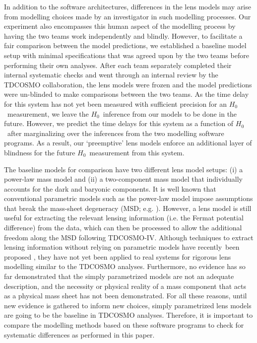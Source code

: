\documentclass[longauth]{aa}
\newcommand{\ho}{$H_0$}
\newcommand{\ajs}[1]{{{#1}}}
\begin{document}
In addition to the software architectures, differences in the lens models may arise from 
modelling choices made by an investigator in such modelling processes. Our experiment also encompasses this human aspect of the modelling process by having the two teams work independently and blindly. However, to facilitate a fair comparison between the model predictions, we established a baseline model setup with minimal specifications that was agreed upon by the two teams before performing their own analyses. After each team separately completed their internal systematic checks and \ajs{went} through an internal review by the TDCOSMO collaboration, the lens models were frozen and the model predictions were un-blinded to make comparisons between the two teams. As the time delay for this system has not yet been measured with sufficient precision for an \ho\ measurement, we leave the \ho\ inference from our models to be done in the future. However, we predict the time delays for this system as a function of \ho\ after marginalizing over the inferences from the two modelling \ajs{software programs}. As a result, our `preemptive' lens models enforce an additional layer of blindness for the future \ho\ measurement from this system. 

The baseline models for comparison have two different lens model setups: (i) a power-law mass model and (ii) a two-component mass model that individually accounts for the dark and baryonic components. 
It is well known that conventional parametric models such as the power-law model impose assumptions that break the mass-sheet degeneracy (MSD; e.g. \citealt{Birrer20,Kochanek20}). However, a lens model is still useful for extracting the relevant lensing information (i.e. the Fermat potential difference) from the data, which can then be processed to allow the additional freedom along the MSD following TDCOSMO-IV. Although techniques to extract lensing information without relying on parametric models have recently~been proposed \citep[e.g.][]{Birrer21}, they have not yet been applied to real systems for rigorous lens modelling similar to the TDCOSMO analyses.
Furthermore, no evidence has so far demonstrated that the simply parametrized models are \ajs{not an adequate description}, \ajs{and the necessity or physical reality of a mass component that acts as a physical mass sheet has not been demonstrated}. For all these reasons, until new evidence is gathered to inform new choices, simply parametrized lens models are going to be the baseline in TDCOSMO analyses. Therefore, it is important to compare the modelling methods based on these \ajs{software programs} to check for systematic differences as performed in this paper. 
\end{document}
